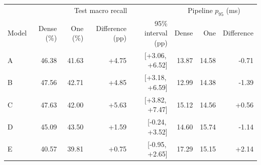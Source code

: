 \begin{tabular}{lrrrrrrr}\hline & \multicolumn{4}{c}{Test macro recall} & \multicolumn{3}{c}{Pipeline $p_{95}$ (ms)} \\ Model & Dense (\%) & One (\%) & Difference (pp) & 95\% interval (pp) & Dense & One & Difference \\ \hline
A & 46.38 & 41.63 & +4.75 & [+3.06,\,+6.52] & 13.87 & 14.58 & -0.71 \\
B & 47.56 & 42.71 & +4.85 & [+3.18,\,+6.59] & 12.99 & 14.38 & -1.39 \\
C & 47.63 & 42.00 & +5.63 & [+3.82,\,+7.47] & 15.12 & 14.56 & +0.56 \\
D & 45.09 & 43.50 & +1.59 & [-0.24,\,+3.52] & 14.60 & 15.74 & -1.14 \\
E & 40.57 & 39.81 & +0.75 & [-0.95,\,+2.65] & 17.29 & 15.15 & +2.14 \\
\hline\end{tabular}
